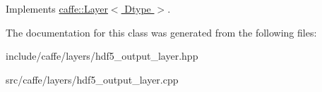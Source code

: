 Implements \hyperlink{classcaffe_1_1Layer_ad9d391b972c769c0ebee34ca6d1c973e}{caffe\+::\+Layer$<$ Dtype $>$}.



The documentation for this class was generated from the following files\+:\begin{DoxyCompactItemize}
\item 
include/caffe/layers/hdf5\+\_\+output\+\_\+layer.\+hpp\item 
src/caffe/layers/hdf5\+\_\+output\+\_\+layer.\+cpp\end{DoxyCompactItemize}
